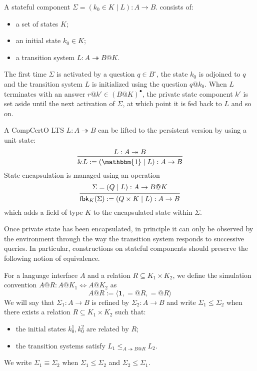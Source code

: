 \documentclass[acmsmall,screen,review,anonymous]{acmart}
\newcommand{\que}{\circ}
\newcommand{\ans}{\bullet}
\begin{document}
\begin{definition}
A stateful component
$\Sigma = (k_0 \in K \mid L) : A \rightarrow B$.
consists of:
\begin{itemize}
  \item a set of states $K$;
  \item an initial state $k_0 \in K$;
  \item a transition system $L : A \twoheadrightarrow B@K$.
\end{itemize}
\end{definition}

The first time $\Sigma$ is activated by a question $q \in B^\que$,
the state $k_0$ is adjoined to $q$
and the transition system $L$ is initialized using the question $q@k_0$.
When $L$ terminates with an answer $r@k' \in (B@K)^\ans$,
the private state component $k'$
is set aside until
the next activation of $\Sigma$,
at which point it is fed back to $L$ and so on.

A CompCertO LTS $L : A \twoheadrightarrow B$
can be lifted to the persistent version
by using a unit state:
\[
  \begin{prooftree}
    \hypo{L : A \twoheadrightarrow B}
    \infer1{\&L := (\mathbbm{1} \mid L) : A \rightarrow B}
  \end{prooftree}
\]
State encapsulation is managed using an operation
\[
  \begin{prooftree}
    \hypo{\Sigma = (Q \mid L) : A \rightarrow B@K}
    \infer1{\mathsf{fbk}_K(\Sigma) := (Q \times K \mid L) : A \rightarrow B}
  \end{prooftree}
\]
which adds a field of type $K$ to the encapsulated state within $\Sigma$.

Once private state has been encapsulated,
in principle it can only be observed by the environment
through the way the transition system responds
to successive queries.
In particular,
constructions on stateful components
should preserve the following notion of equivalence.

\begin{definition} \label{def:ssim}
For a language interface $A$ and a relation $R \subseteq K_1 \times K_2$,
we define the simulation convention $A@R : A@K_1 \Leftrightarrow A@K_2$ as
\[
  A@R := \langle \mathbf{1}, {=}@R, {=}@R \rangle
\]
We will say that $\Sigma_1 : A \rightarrow B$
is refined by $\Sigma_2 : A \rightarrow B$
and write $\Sigma_1 \le \Sigma_2$
when there exists a relation $R \subseteq K_1 \times K_2$
such that:
\begin{itemize}
  \item the initial states $k_0^1, k_0^2$ are related by $R$;
  \item the transition systems satisfy
    $L_1 \le_{A \twoheadrightarrow B@R} L_2$.
\end{itemize}
We write $\Sigma_1 \equiv \Sigma_2$ when
$\Sigma_1 \le \Sigma_2$ and
$\Sigma_2 \le \Sigma_1$.
\end{definition}
\end{document}
